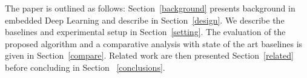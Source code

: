 The paper is outlined as follows: Section~\ref{background} presents background in embedded Deep Learning and describe \method\hspace{0.02in} in Section~\ref{design}.
We describe the baselines and experimental setup in Section~\ref{setting}.
The evaluation of the proposed algorithm and a comparative analysis with state of the art baselines is given in Section~\ref{compare}.
Related work are then presented Section~\ref{related} before concluding in Section ~\ref{conclusions}.
